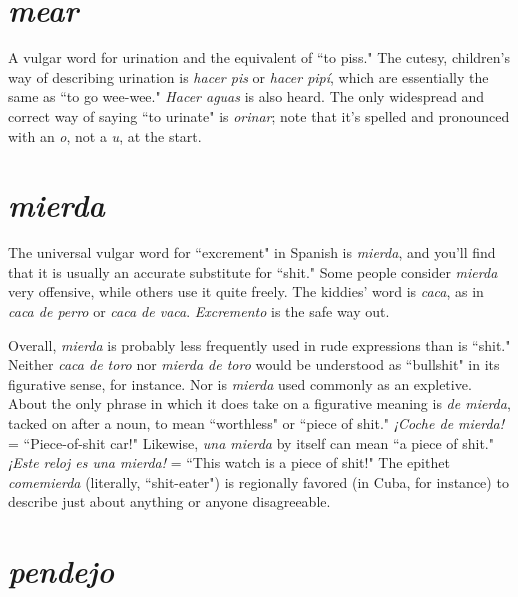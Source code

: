\section{\emph{mear}}

A vulgar word for urination and the equivalent of ``to piss."
The cutesy, children's way of describing urination is \emph{hacer pis} or \emph{hacer
	pipí}, which are essentially the same as ``to go wee-wee." \emph{Hacer aguas}
is also heard. The only widespread and correct way of saying ``to urinate" is \emph{orinar}; note that it's spelled and pronounced with an \emph{o}, not a
\emph{u}, at the start.

\section{\emph{mierda}}

The universal vulgar word for ``excrement" in Spanish is
\emph{mierda}, and you'll find that it is usually an accurate substitute for
``shit." Some people consider \emph{mierda} very offensive, while others use it
quite freely. The kiddies' word is \emph{caca}, as in \emph{caca de perro} or \emph{caca de
	vaca}. \emph{Excremento} is the safe way out.

Overall, \emph{mierda} is probably less frequently used in rude expressions than is ``shit." Neither \emph{caca de toro} nor \emph{mierda de toro}
would be understood as ``bullshit" in its figurative sense, for instance.
Nor is \emph{mierda} used commonly as an expletive. About the only phrase
in which it does take on a figurative meaning is \emph{de mierda}, tacked
on after a noun, to mean ``worthless" or ``piece of shit." \emph{¡Coche de
	mierda!} = ``Piece-of-shit car!" Likewise, \emph{una mierda} by itself can
mean ``a piece of shit." \emph{¡Este reloj es una mierda!} = ``This watch is a
piece of shit!" The epithet \emph{comemierda} (literally, ``shit-eater") is regionally favored (in Cuba, for instance) to describe just about anything
or anyone disagreeable.

\section{\emph{pendejo}}

